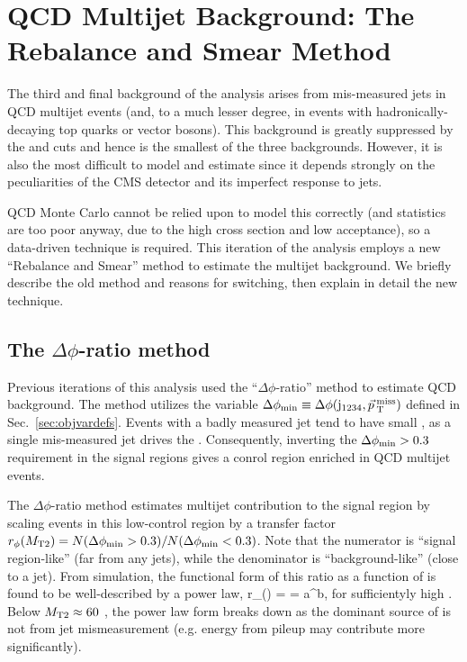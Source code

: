 \chapter{QCD Multijet Background: The Rebalance and Smear Method}
\label{chap:qcd}

The third and final background of the \mttwo analysis arises from mis-measured
jets in QCD multijet events (and, to a much lesser degree, in events with 
hadronically-decaying top quarks or vector bosons). 
This background is greatly suppressed by the
\mttwo and \dphimet cuts and hence is the smallest of the three backgrounds. 
However, it is also the most difficult to model and estimate since it depends
strongly on the peculiarities of the CMS detector and its imperfect response to jets.

QCD Monte Carlo cannot be relied upon to model this correctly (and statistics are too poor
anyway, due to the high cross section and low acceptance), so a data-driven technique is required.
This iteration of the analysis employs a new ``Rebalance and Smear'' method 
to estimate the multijet background. We briefly describe the old method and reasons 
for switching, then explain in detail the new technique.

\section{The \texorpdfstring{$\Delta\phi$}{}-ratio method}

Previous iterations of this analysis \cite{CMS:mt22016,CMS:mt22015} 
used the ``$\Delta\phi$-ratio'' method to estimate QCD background.
The method utilizes the variable $\Delta\phi_{\mathrm{min}} \equiv \Delta\phi(\mathrm{j}_{1234},\vec{p}_{\> \mathrm{T}}^{\> \mathrm{miss}})$ defined in
Sec.~\ref{sec:objvardefs}. Events with a badly measured jet tend to have
small \dpmin, as a single mis-measured jet drives the \vMet. Consequently,
inverting the $\Delta\phi_{\mathrm{min}}>0.3$ requirement in the signal regions gives a 
conrol region enriched in QCD multijet events.

The $\Delta\phi$-ratio method estimates multijet contribution to the 
signal region by scaling events in this low-\dpmin control region
by a transfer factor $r_\phi(M_{\mathrm{T2}}) = N(\Delta\phi_{\mathrm{min}} > 0.3) / N(\Delta\phi_{\mathrm{min}} < 0.3)$.
Note that the numerator is ``signal region-like'' (\vMet far from any jets),
while the denominator is ``background-like'' (\vMet close to a jet).
From simulation, the functional form of this ratio as a function of \mttwo
is found to be well-described by a power law,
\be
r_\phi(\mttwo) =  = a\cdot\mttwo^b,
\ee
for sufficientyly high \mttwo. Below $M_{\mathrm{T2}}\approx60$ \GeV, the power law
form breaks down as the dominant source of \vMet is not from jet mismeasurement
(e.g. energy from pileup may contribute more significantly).

